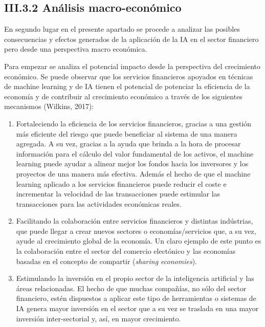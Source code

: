 \documentclass[]{DissertateUSU}
\begin{document}
\FloatBarrier
{}
\fancyfoot[C]{\thepage}

\subsection{III.3.2 \textbf{Análisis macro-económico}}

\justifying

\noindent En segundo lugar en el presente apartado se procede a analizar
las posibles consecuencias y efectos generados de la aplicación de la IA
en el sector financiero pero desde una perspectiva macro económica.

\noindent Para empezar se analiza el potencial impacto desde la
perspectiva del crecimiento económico. Se puede observar que los
servicios financieros apoyados en técnicas de machine learning y de IA
tienen el potencial de potenciar la eficiencia de la economía y de
contribuir al crecimiento económico a través de los siguientes
mecanismos (Wilkins, 2017):

\begin{enumerate}
\def\labelenumi{\roman{enumi})}
\item
  Fortaleciendo la eficiencia de los servicios financieros, gracias a
  una gestión más eficiente del riesgo que puede beneficiar al sistema
  de una manera agregada. A su vez, gracias a la ayuda que brinda a la
  hora de procesar información para el cálculo del valor fundamental de
  los activos, el machine learning puede ayudar a alinear mejor los
  fondos hacia los inversores y los proyectos de una manera más
  efectiva. Además el hecho de que el machine learning aplicado a los
  servicios financieros puede reducir el coste e incrementar la
  velocidad de las transacciones puede estimular las transacciones para
  las actividades económicas reales.
\item
  Facilitando la colaboración entre servicios financieros y distintas
  indústrias, que puede llegar a crear nuevos sectores o
  economías/servicios que, a su vez, ayude al crecimiento global de la
  economía. Un claro ejemplo de este punto es la colaboración entre el
  sector del comercio electónico y las economías basadas en el concepto
  de compartir (\emph{sharing economies}).
\item
  Estimulando la inversión en el propio sector de la inteligencia
  artificial y las áreas relacionadas. El hecho de que muchas compañías,
  no sólo del sector financiero, estén dispuestos a aplicar este tipo de
  herramientas o sistemas de IA genera mayor inversión en el sector que
  a su vez se traslada en una mayor inversión inter-sectorial y, así, en
  mayor crecimiento.
\end{enumerate}
\end{document}
